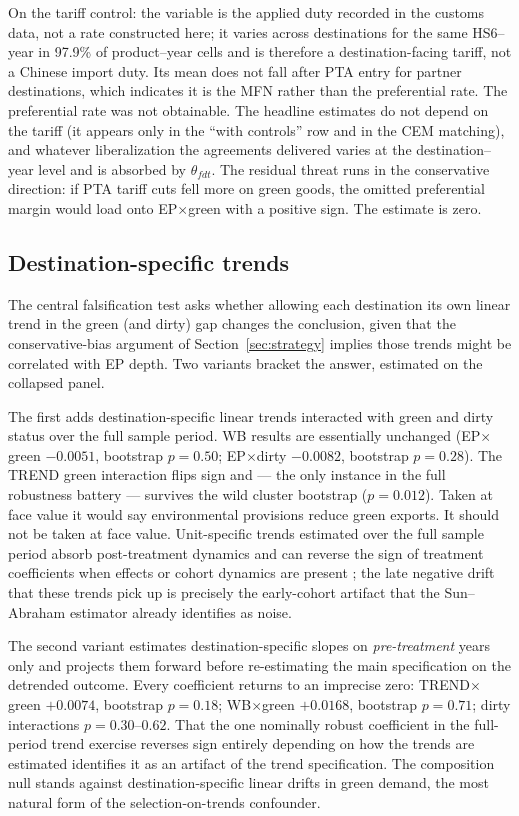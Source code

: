 \documentclass[12pt]{article}
\begin{document}
On the tariff control: the variable is the applied duty recorded in the customs data,
not a rate constructed here; it varies across destinations for the same HS6--year in
97.9\% of product--year cells and is therefore a destination-facing tariff, not a
Chinese import duty. Its mean does not fall after PTA entry for partner destinations,
which indicates it is the MFN rather than the preferential rate. The preferential rate
was not obtainable. The headline estimates do not depend on the tariff (it appears only
in the ``with controls'' row and in the CEM matching), and whatever liberalization the
agreements delivered varies at the destination--year level and is absorbed by
$\theta_{fdt}$. The residual threat runs in the conservative direction: if PTA tariff
cuts fell more on green goods, the omitted preferential margin would load onto
EP$\times$green with a positive sign. The estimate is zero.

\subsection{Destination-specific trends}

The central falsification test asks whether allowing each destination its own linear
trend in the green (and dirty) gap changes the conclusion, given that the conservative-bias
argument of Section~\ref{sec:strategy} implies those trends might be correlated with EP
depth. Two variants bracket the answer, estimated on the collapsed panel.

The first adds destination-specific linear trends interacted with green and dirty status
over the full sample period. WB results are essentially unchanged (EP$\times$green
$-0.0051$, bootstrap $p = 0.50$; EP$\times$dirty $-0.0082$, bootstrap $p = 0.28$). The
TREND green interaction flips sign and --- the only instance in the full robustness
battery --- survives the wild cluster bootstrap ($p = 0.012$). Taken at face value it
would say environmental provisions reduce green exports. It should not be taken at face
value. Unit-specific trends estimated over the full sample period absorb post-treatment
dynamics and can reverse the sign of treatment coefficients when effects or cohort
dynamics are present \citep{wolfers2006}; the late negative drift that these trends pick
up is precisely the early-cohort artifact that the Sun--Abraham estimator already
identifies as noise.

The second variant estimates destination-specific slopes on \emph{pre-treatment} years
only and projects them forward before re-estimating the main specification on the
detrended outcome. Every coefficient returns to an imprecise zero: TREND$\times$green
$+0.0074$, bootstrap $p = 0.18$; WB$\times$green $+0.0168$, bootstrap $p = 0.71$; dirty
interactions $p = 0.30$--$0.62$. That the one nominally robust coefficient in the
full-period trend exercise reverses sign entirely depending on how the trends are
estimated identifies it as an artifact of the trend specification. The composition null
stands against destination-specific linear drifts in green demand, the most natural form
of the selection-on-trends confounder.
\end{document}
